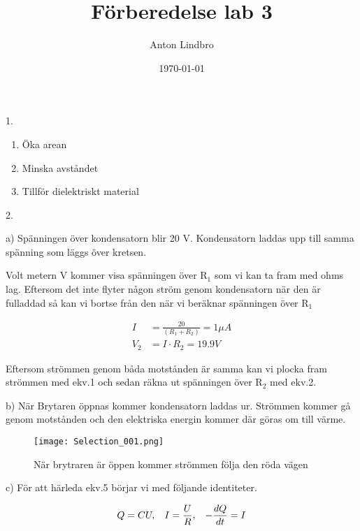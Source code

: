 \documentclass[a4paper]{article}
\title{Förberedelse lab 3}
\author{Anton Lindbro}
\date{\today}
\begin{document}
\maketitle

1.

\begin{enumerate}
    \item Öka arean
    \item Minska avståndet
    \item Tillför dielektriskt material
\end{enumerate}

2.

a) Spänningen över kondensatorn blir 20 V. Kondensatorn laddas upp till samma spänning som läggs över kretsen.

Volt metern V kommer visa spänningen över R$_1$ som vi kan ta fram med ohms lag. Eftersom det inte flyter någon ström genom kondensatorn när den är fulladdad så kan vi bortse från den när vi beräknar spänningen över R$_1$

\begin{align}
    I &= \frac{20}{(R_1 + R_2)} =  1 \mu A\\
    V_2 &= I \cdot R_2 = 19.9 V
\end{align}

Eftersom strömmen genom båda motstånden är samma kan vi plocka fram strömmen med ekv.1 och sedan räkna ut spänningen över R$_2$ med ekv.2. 

b) När Brytaren öppnas kommer kondensatorn laddas ur. Strömmen kommer gå genom motstånden och den elektriska energin kommer där göras om till värme. 

\begin{figure}[H]
    \begin{small}
        \begin{center}
            \texttt{[image: Selection\_001.png]}
        \end{center}
        \caption{När brytraren är öppen kommer strömmen följa den röda vägen}
        \label{fig:krets}
    \end{small}
\end{figure}

c) För att härleda ekv.5 börjar vi med följande identiteter.

\begin{align}
    Q = CU, \hspace{3mm} I = \frac{U}{R}, \hspace{3mm}  -\frac{dQ}{dt} = I
\end{align}
\end{document}
